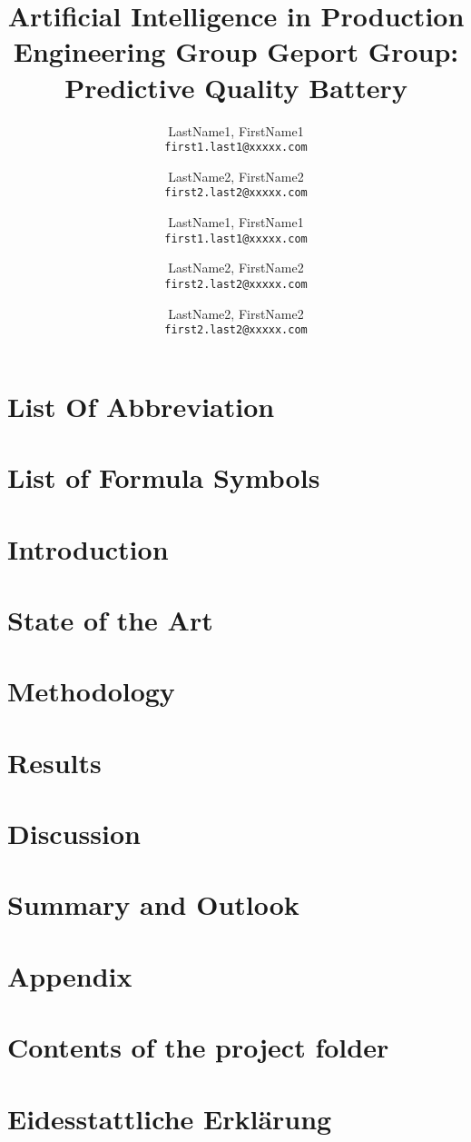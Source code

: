 \documentclass[]{report}
\title{Artificial Intelligence in Production Engineering   \linebreak \linebreak Group Geport \linebreak Group: Predictive Quality Battery}
\author{ LastName1, FirstName1\\
	\texttt{first1.last1@xxxxx.com}
	\and
	LastName2, FirstName2\\
	\texttt{first2.last2@xxxxx.com}
	\and
	LastName1, FirstName1\\
	\texttt{first1.last1@xxxxx.com}
	\and
	LastName2, FirstName2\\
	\texttt{first2.last2@xxxxx.com}
	\and
	LastName2, FirstName2\\
	\texttt{first2.last2@xxxxx.com}
}
\begin{document}
\maketitle
\begin{abstract}
\end{abstract}

\tableofcontents
\renewcommand{\thechapter}{\Roman{chapter}}
\chapter{List Of Abbreviation}
\chapter{List of Formula Symbols}

\listoffigures
\listoftables

\setcounter{chapter}{0}
\renewcommand{\thechapter}{\arabic{chapter}}
\chapter{Introduction}
\chapter{State of the Art}
\chapter{Methodology}
\chapter{Results}
\chapter{Discussion}
\chapter{Summary and Outlook}
\chapter{Appendix}
\printbibliography
\renewcommand{\thechapter}{\Roman{chapter}}
\setcounter{chapter}{2}
\chapter{Contents of the project folder}
\chapter{Eidesstattliche Erklärung}
\end{document}
